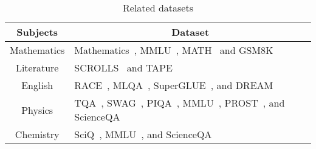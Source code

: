 \documentclass{article}
\begin{document}
{	\begingroup
	\renewcommand{\arraystretch}{1.5} \begin{table}[ht!]
		\caption{Related datasets}
		\label{tabl:dataset}
		\begin{tabular}{|c|l|}
			\hline
			\textbf{Subjects}        & \multicolumn{1}{c|}{\textbf{Dataset}}                                                                                                                                                                                                                                                                                                                                                                  \\ \hline
			Mathematics     & Mathematics~\cite{saxton2019analysing}, MMLU~\cite{hendrycks2020measuring}, MATH~\cite{hendrycks2021measuring} and GSM8K~\cite{cobbe2021training}                                                                                                                                                              \\ \hline
			Literature      & SCROLLS~\cite{shaham2022scrolls} and TAPE~\cite{taktasheva2022tape}                                                                                                                                                                                                                                                                                            \\ \hline
			English         & RACE~\cite{Lai2017}, MLQA~\cite{lewis2019mlqa}, SuperGLUE~\cite{wang2019superglue}, and DREAM~\cite{sun2019dream}                                                                                                                                                                                                  \\ \hline
			Physics         & TQA~\cite{kembhavi2017you}, SWAG~\cite{zellers2018swag}, PIQA~\cite{bisk2020piqa}, MMLU~\cite{hendrycks2020measuring}, PROST~\cite{aroca2021prost}, and ScienceQA~\cite{lu2022learn}                                                                                                                                     \\ \hline
			Chemistry       & SciQ~\cite{welbl2017crowdsourcing}, MMLU~\cite{hendrycks2020measuring}, and ScienceQA~\cite{lu2022learn}                                                                                                                                                                                                                            \\ \hline

\end{tabular}
\end{table}}
\end{document}
